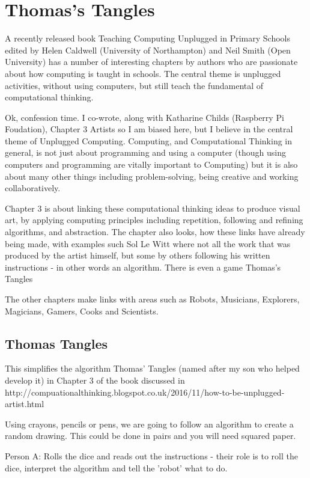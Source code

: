 
\chapter{Thomas's Tangles}
A recently released book Teaching Computing Unplugged in Primary Schools  edited by Helen Caldwell (University of Northampton) and Neil Smith (Open University) has a number of interesting chapters by authors who are passionate about how computing is taught in schools. The central theme is unplugged activities, without using computers, but still teach the fundamental of computational thinking.

Ok, confession time. I co-wrote, along with Katharine Childs (Raspberry Pi Foudation), Chapter 3 Artists so I am biased here, but I believe in the central theme of Unplugged Computing. Computing, and Computational Thinking in general,  is not just about programming and using a computer (though using computers and  programming are vitally important to Computing) but it is also about many other things including problem-solving, being creative and working collaboratively.

Chapter 3 is about linking these computational thinking ideas to produce visual art, by applying computing principles including  repetition, following and refining algorithms, and abstraction. The chapter also looks, how these links have already being made, with examples such Sol Le Witt where not all the work that was produced by the artist himself, but some by others following his written instructions - in other words an algorithm. There is even a game Thomas's Tangles

The other chapters make links with areas such as Robots, Musicians, Explorers, Magicians, Gamers, Cooks and Scientists.

\section{Thomas Tangles}
This simplifies the algorithm Thomas' Tangles (named after my son who helped develop it) in Chapter 3 of the book discussed in http://compuationalthinking.blogspot.co.uk/2016/11/how-to-be-unplugged-artist.html

Using crayons, pencils or pens, we are going to follow an algorithm to create a random drawing. This could be done in pairs and you will need squared paper. 

Person A: Rolls the dice and reads out the instructions - their role is to roll the dice, interpret the algorithm and tell the 'robot' what to do.

